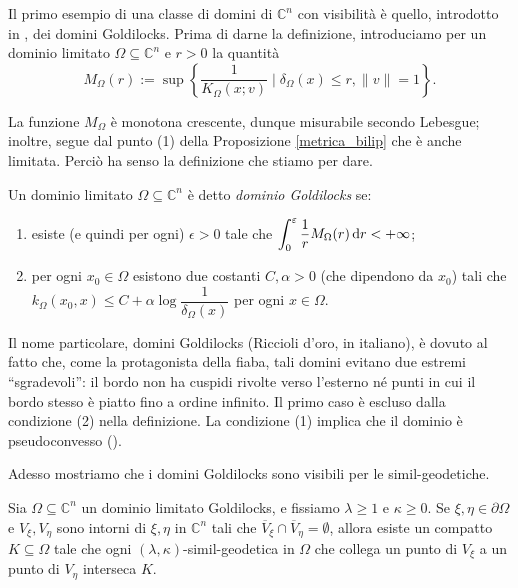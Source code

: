 Il primo esempio di una classe di domini di $\mathbb{C}^n$ con visibilità è quello, introdotto in \cite{BZ1}, dei domini Goldilocks. Prima di darne la definizione, introduciamo per un dominio limitato $\Omega\subseteq\mathbb{C}^n$ e $r>0$ la quantità
$$M_\Omega(r):=\sup\left\{\frac{1}{K_\Omega(x;v)}\mid \delta_\Omega(x) \le r, \|v\|=1\right\}.$$

La funzione $M_\Omega$ è monotona crescente, dunque misurabile secondo Lebesgue; inoltre, segue dal punto (1) della Proposizione \ref{metrica_bilip} che è anche limitata. Perciò ha senso la definizione che stiamo per dare.

\begin{defn} \label{gold}
    Un dominio limitato $\Omega\subseteq\mathbb{C}^n$ è detto \textit{dominio Goldilocks} se:
    \begin{enumerate}[label={(\arabic*)}]
        \item esiste (e quindi per ogni) $\epsilon>0$ tale che $\displaystyle\int_0^{\varepsilon} \frac{1}{r}M_\Omega(r)\mathop{}\!\mathrm{d} r<+\infty$;
        \item per ogni $x_0\in\Omega$ esistono due costanti $C,\alpha>0$ (che dipendono da $x_0$) tali che $k_\Omega(x_0,x) \le C+\alpha\log{\dfrac{1}{\delta_\Omega(x)}}$ per ogni $x\in\Omega$.
    \end{enumerate}
\end{defn}

\begin{oss}
    Il nome particolare, domini Goldilocks (Riccioli d'oro, in italiano), è dovuto al fatto che, come la protagonista della fiaba, tali domini evitano due estremi ``sgradevoli'': il bordo non ha cuspidi rivolte verso l'esterno né punti in cui il bordo stesso è piatto fino a ordine infinito. Il primo caso è escluso dalla condizione (2) nella definizione. La condizione (1) implica che il dominio è pseudoconvesso (\cite[Proposition 2.15]{BZ1}).
\end{oss}

Adesso mostriamo che i domini Goldilocks sono visibili per le simil-geodetiche.

\begin{thm} \label{gold_is_vis}
    Sia $\Omega\subseteq\mathbb{C}^n$ un dominio limitato Goldilocks, e fissiamo $\lambda\ge 1$ e $\kappa\ge 0$. Se $\xi,\eta\in\partial\Omega$ e $V_\xi,V_\eta$ sono intorni di $\xi,\eta$ in $\mathbb{C}^n$ tali che $\overline{V}_\xi\cap\overline{V}_\eta=\emptyset$, allora esiste un compatto $K\subseteq\Omega$ tale che ogni $(\lambda,\kappa)$-simil-geodetica in $\Omega$ che collega un punto di $V_\xi$ a un punto di $V_\eta$ interseca $K$.
\end{thm}

